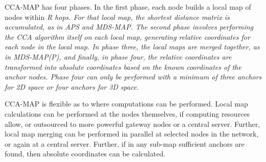CCA-MAP has four phases.  In the first phase, each node builds a local map of nodes within \em{R} hops.  For that local map, the shortest distance matrix is accumulated, as in APS and MDS-MAP.  The second phase involves performing the CCA algorithm itself on each local map, generating relative coordinates for each node in the local map.  In phase three, the local maps are merged together, as in MDS-MAP(P), and finally, in phase four, the relative coordinates are transformed into absolute coordinates based on the known coordinates of the anchor nodes.  Phase four can only be performed with a minimum of three anchors for \em{2D} space or four anchors for \em{3D} space.  

CCA-MAP is flexible as to where computations can be performed. Local map calculations can be performed at the nodes themselves, if computing resources allow, or outsourced to more powerful gateway nodes or a central server.  Further, local map merging can be performed in parallel at selected nodes in the network, or again at a central server.  Further, if in any sub-map sufficient anchors are found, then absolute coordinates can be calculated.


